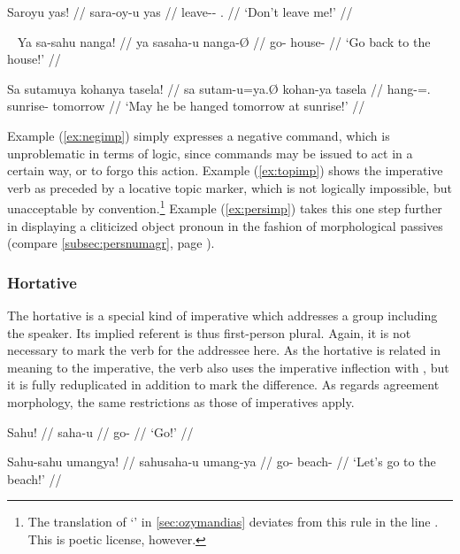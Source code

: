 \ex\label{ex:negimp}\begingl
	\gla Saroyu yas! //
	\glb sara-oy-u yas //
	\glc leave-\Neg{}-\Imp{} \Fsg{}.\Parg{} //
	\glft `Don't leave me!' //
\endgl\xe

\pex~\label{ex:agrimp}
\a\label{ex:topimp}\ljudge*\begingl
	\gla Ya sa-sahu nanga! //
	\glb ya sa\til{}saha-u nanga-Ø //
	\glc \LocT{} \Iter{}\til{}go-\Imp{} house-\Top{} //
	\glft `Go back to the house!' //
\endgl

\a\label{ex:persimp}\ljudge*\begingl
	\gla Sa sutamuya kohanya tasela! //
	\glb sa sutam-u=ya.Ø kohan-ya tasela //
	\glc \PatT{} hang-\Imp{}=\TsgM{}.\Top{} sunrise-\Loc{} tomorrow //
	\glft `May he be hanged tomorrow at sunrise!' //
\endgl
\xe

Example (\ref{ex:negimp}) simply expresses a negative command, which is
unproblematic in terms of logic, since commands may be issued to act in a
certain way, or to forgo this action. Example (\ref{ex:topimp}) shows the
imperative verb as preceded by a locative topic marker, which is not logically
impossible, but unacceptable by convention.\footnote{The translation of
`' in \autoref{sec:ozymandias} deviates from
this rule in the line . This is poetic license, however.} Example (\ref{ex:persimp})
takes  this one step further in displaying a cliticized object pronoun in the
fashion  of morphological passives (compare \autoref{subsec:persnumagr}, page
\pageref{patagr}).


\subsubsection{Hortative}

The hortative is a special kind of imperative which addresses a group 
including the speaker. Its implied referent is thus first-person plural. 
Again, it is not necessary to mark the verb for the addressee here. As 
the hortative is related in meaning to the imperative, the verb also uses the 
imperative inflection with , but it is fully reduplicated in 
addition to mark the difference. As regards agreement morphology, the same 
restrictions as those of imperatives apply.

\pex
\a\begingl
	\gla Sahu! //
	\glb saha-u //
	\glc go-\Imp{} //
	\glft `Go!' //
\endgl

\a\begingl
	\gla Sahu-sahu umangya! //
	\glb sahu\til{}saha-u umang-ya //
	\glc \Hort{}\til{}go-\Imp{} beach-\Loc{} //
	\glft `Let's go to the beach!' //
\endgl
\xe

